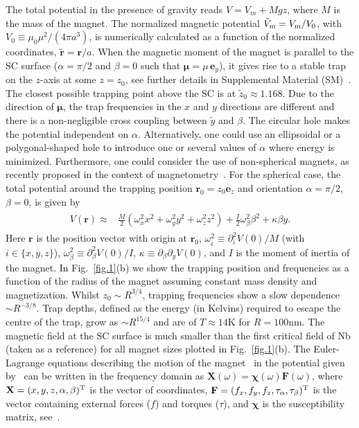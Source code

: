 \documentclass[twocolumn,superscriptaddress,floatfix,preprintnumbers,prl]{revtex4}
\begin{document}
The total potential in the presence of gravity reads $V =  V_m + M g z$,
where $M$ is the mass of the  magnet. 
The normalized magnetic potential $\tilde{V}_{\rm m}=V_{\rm m}/V_0$, with $V_0 \equiv \mu_0 \mu^2/(4\pi a^3)$, is numerically calculated as a function of the normalized coordinates, $\tilde{\mathbf{r}} = \mathbf{r}/a$. When the magnetic moment of the magnet is parallel to the SC surface ($\alpha=\pi/2$ and $\beta=0$ such that $\boldsymbol{\mu}=\mu \,\mathbf{e}_y$), it gives rise to a stable trap on the $z$-axis at some $z=z_0$, see further details in Supplemental Material (SM)~\cite{SM}. 
%
The closest possible trapping point above the SC is at $\tilde{z}_0 \approx 1.168$.
Due to the direction of $\boldsymbol{\mu}$, the trap frequencies in the $x$ and $y$ directions are different and there is a non-negligible cross coupling between $\tilde{y}$ and $\beta$.
%
The circular hole makes the potential independent on $\alpha$. Alternatively, one could use an ellipsoidal or a polygonal-shaped hole to introduce one or several values of $\alpha$ where energy is minimized. Furthermore, one could consider the use of non-spherical magnets, as recently proposed in the context of magnetometry~\cite{JacksonKimball2016}. For the spherical case, the total potential around the trapping position $\mathbf{r}_0=z_0 \mathbf{e}_z$ and orientation $\alpha=\pi/2$, $\beta=0$, is given by
\begin{align} \label{eq:Potential}
\begin{split}
V(\mathbf{r})\approx & \frac{M}{2}\left(\omega_x^2 x^2 + \omega_y^2 y^2 +\omega_z^2 z^2 \right) +\frac{I}{2}\omega_{\beta}^2 \beta^2+\kappa \beta y.
\end{split}
\end{align}
Here $\mathbf{r}$ is the position vector with origin at $\mathbf{r}_0$,  $\omega_i^2 \equiv \partial_i^2V(0)/M$ (with $i\in\{x,y,z\}$), $\omega_{\beta}^2\equiv \partial_{\beta}^2 V(0)/I$, $\kappa \equiv \partial_{\beta}\partial_y V(0)$, and $I$ is the moment of inertia of the magnet. 
%
In Fig.~\ref{fig.1}(b) we show the trapping position and frequencies as a function of the radius of the magnet assuming constant mass density and magnetization. Whilst $z_0\sim R^{3/4}$, trapping frequencies show a slow dependence $\sim R^{-3/8}$. Trap depths, defined as the energy (in Kelvins) required to escape the centre of the trap,  grow as $\sim R^{15/4}$ and are of $T\approx 14$K for $R=100$nm. 
The magnetic field at the SC surface is much smaller than the first critical field of Nb (taken as a reference) for all magnet sizes plotted in Fig.~\ref{fig.1}(b). The Euler-Lagrange equations describing the motion of the  magnet~\cite{Rusconi2017} in the potential given by~ can be written in the frequency domain as $\mathbf{X}(\omega)=\boldsymbol{\chi}(\omega)\mathbf{F}(\omega)$, where $\mathbf{X}=(x,y,z,\alpha,\beta)^{\rm T}$ is the vector of coordinates,  $\mathbf{F}=(f_x,f_y,f_z,\tau_{\alpha},\tau_{\beta})^{\rm T}$ is the vector containing external forces ($f$) and torques ($\tau$), and $\boldsymbol{\chi}$ is the susceptibility matrix, see~\cite{SM}. 
\end{document}
